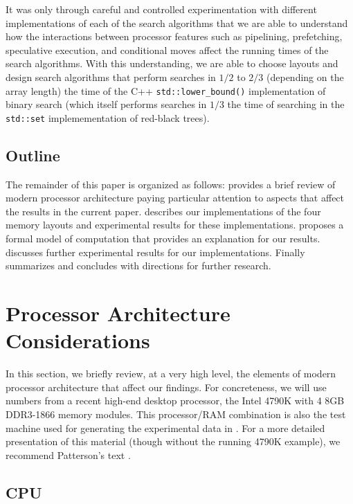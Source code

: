 \documentclass{patmorin}
\begin{document}
It was only through careful and controlled experimentation with
different implementations of each of the search algorithms that
we are able to understand how the interactions between processor
features such as pipelining, prefetching, speculative execution, and
conditional moves affect the running times of the search algorithms.
With this understanding, we are able to choose layouts and design search
algorithms that perform searches in $1/2$ to $2/3$ (depending on the
array length) the time of the C++ \texttt{std::lower_bound()}
implementation of binary search (which itself performs searches in $1/3$
the time of searching in the \texttt{std::set} implemementation of
red-black trees).

\subsection{Outline}

The remainder of this paper is organized as follows: 
provides a brief review of modern processor architecture paying particular
attention to aspects that affect the results in the current paper.
 describes our implementations of the four memory layouts
and experimental results for these implementations. 
proposes a formal model of computation that provides an explanation for
our results.   discusses further experimental results
for our implementations.  Finally  summarizes and
concludes with directions for further research.

\section{Processor Architecture Considerations}

In this section, we briefly review, at a very high level, the
elements of modern processor architecture that affect our findings.
For concreteness, we will use numbers from a recent high-end desktop
processor, the Intel 4790K \cite{intel:4790k} with 4 8GB DDR3-1866 memory
modules.  This processor/RAM combination is also the test machine used
for generating the experimental data in .  For a more
detailed presentation of this material (though without the running 4790K
example), we recommend Patterson's text \cite{patterson:modern}.


\subsection{CPU}
\end{document}
